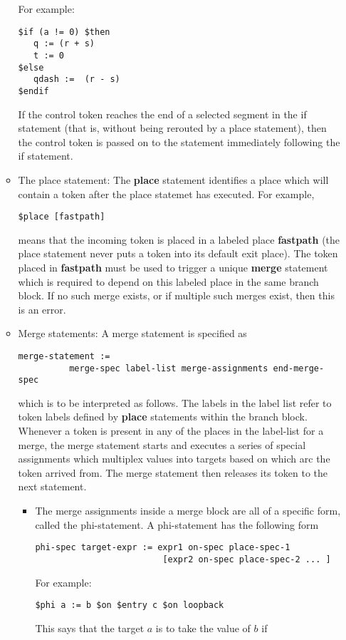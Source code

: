 \documentclass{article}
\begin{document}
\begin{itemize}
\begin{itemize}
\begin{verbatim}
\end{verbatim}
For example:
\begin{verbatim}
$if (a != 0) $then
   q := (r + s)
   t := 0
$else
   qdash :=  (r - s)
$endif
\end{verbatim}
If the control token reaches the end of a selected
segment in the if statement (that is, without being
rerouted by a place statement), then the control
token is passed on to the statement immediately
following the if statement.
\item The place statement: The {\bf place} statement
identifies a place which will contain 
a token after the place statemet has executed.  For example,
\begin{verbatim}
$place [fastpath]
\end{verbatim}%
means that the incoming token is placed in a labeled
place {\bf fastpath} (the place statement never
puts a token into its default exit place).  
The token placed in {\bf fastpath} must be used to
trigger a unique {\bf merge} statement which is required
to depend on this labeled place in the same branch
block. If no such merge exists, or if multiple such merges exist, 
then this is an error.
\item Merge statements: A merge statement is
specified as 
\begin{verbatim}
merge-statement :=
          merge-spec label-list merge-assignments end-merge-spec
\end{verbatim}
which is to be interpreted as follows.  The labels in the label list
refer to token labels defined by {\bf place}  statements within the branch block.
Whenever a token is present in any of the places in
the label-list for a merge,
the merge statement starts and executes a series of special assignments
which multiplex values into targets based on which arc the
token arrived from.  The merge statement then releases its token to
the next statement. 
\begin{itemize}
\item 
The merge assignments inside a merge block are all of a specific
form, called the phi-statement.  A phi-statement has the following
form
\begin{verbatim}
phi-spec target-expr := expr1 on-spec place-spec-1  
                         [expr2 on-spec place-spec-2 ... ]
\end{verbatim}
For example:
\begin{verbatim}
$phi a := b $on $entry c $on loopback 
\end{verbatim}
This says that the target $a$ is to take the value of $b$ if

\end{itemize}
\end{itemize}
\end{itemize}
\end{document}
